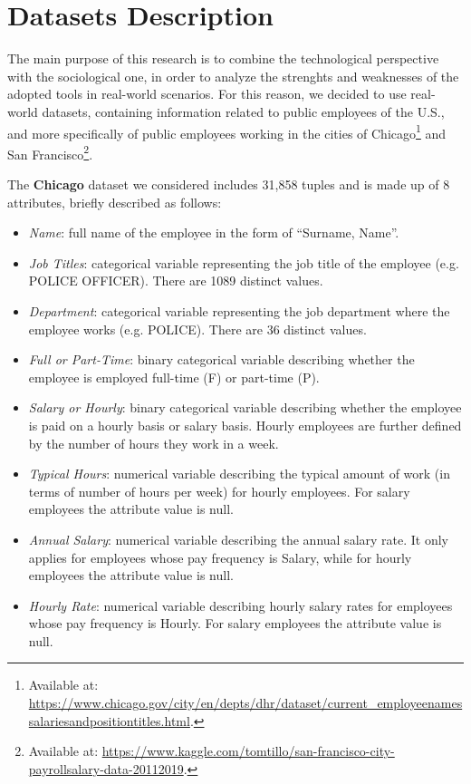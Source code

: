 \section{Datasets Description}
The main purpose of this research is to combine the technological perspective with the sociological one, in order to analyze the strenghts and weaknesses of the adopted tools in real-world scenarios. For this reason, we decided to use real-world datasets, containing information related to public employees of the U.S., and more specifically of public employees working in the cities of Chicago\footnote{Available at: \url{https://www.chicago.gov/city/en/depts/dhr/dataset/current_employeenamessalariesandpositiontitles.html}.} and San Francisco\footnote{Available at: \url{https://www.kaggle.com/tomtillo/san-francisco-city-payrollsalary-data-20112019}.}.

The \textbf{Chicago} dataset we considered includes 31,858 tuples and is made up of 8 attributes, briefly described as follows:
\begin{itemize}
\item \textit{Name}: full name of the employee in the form of ``Surname, Name''.
\item \textit{Job Titles}: categorical variable representing the job title of the employee (e.g. POLICE OFFICER). There are 1089 distinct values.
\item \textit{Department}: categorical variable representing the job department where the employee works (e.g. POLICE). There are 36 distinct values.
\item \textit{Full or Part-Time}: binary categorical variable describing whether the employee is employed full-time (F) or part-time (P).
\item \textit{Salary or Hourly}: binary categorical variable describing whether the employee is paid on a hourly basis or salary basis. Hourly employees are further defined by the number of hours they work in a week.
\item \textit{Typical Hours}: numerical variable describing the typical amount of work (in terms of number of hours per week) for hourly employees. For salary employees the attribute value is null.
\item \textit{Annual Salary}: numerical variable describing the annual salary rate. It only applies for employees whose pay frequency is Salary, while for hourly employees the attribute value is null.
\item \textit{Hourly Rate}: numerical variable describing hourly salary rates for employees whose pay frequency is Hourly. For salary employees the attribute value is null.
\end{itemize}

